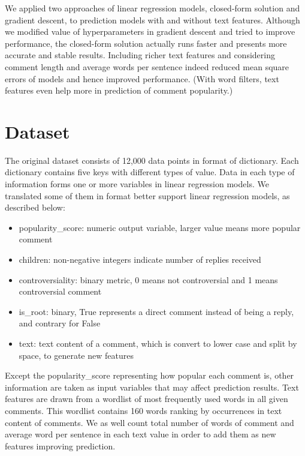 \documentclass[12pt]{article}
\begin{document}
We applied two approaches of linear regression models, closed-form solution and gradient descent, to prediction models with and without text features. Although we modified value of hyperparameters in gradient descent and tried to improve performance, the closed-form solution actually runs faster and presents more accurate and stable results. Including richer text features and considering comment length and average words per sentence indeed reduced mean square errors of models and hence improved performance. (With word filters, text features even help more in prediction of comment popularity.) 

\section*{Dataset}
The original dataset consists of 12,000 data points in format of dictionary. Each dictionary contains five keys with different types of value. Data in each type of information forms one or more variables in linear regression models. We translated some of them in format better support linear regression models, as described below:

\begin{itemize}
    \item popularity\_score: numeric output variable, larger value means more popular comment
    \item children: non-negative integers indicate number of replies received
    \item controversiality: binary metric, 0 means not controversial and 1 means controversial comment
    \item is\_root: binary, True represents a direct comment instead of being a reply, and contrary for False
    \item text: text content of a comment, which is convert to lower case and split by space, to generate new features
\end{itemize}

Except the popularity\_score representing how popular each comment is, other information are taken as input variables that may affect prediction results. Text features are drawn from a wordlist of most frequently used words in all given comments. This wordlist contains 160 words ranking by occurrences in text content of comments. We as well count total number of words of comment and average word per sentence in each text value in order to add them as new features improving prediction.\\
\end{document}
